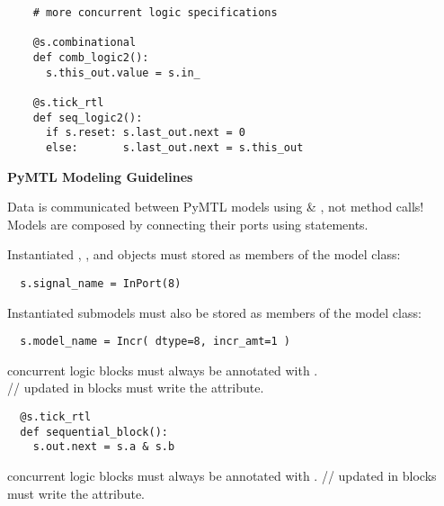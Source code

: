 \documentclass{cbxdoc}
\begin{document}
\begin{landscape}
\begin{minipage}[t]{3.25in}
\begin{lstlisting}
    # more concurrent logic specifications

    @s.combinational
    def comb_logic2():
      s.this_out.value = s.in_

    @s.tick_rtl
    def seq_logic2():
      if s.reset: s.last_out.next = 0
      else:       s.last_out.next = s.this_out
\end{lstlisting}

\end{minipage}%
\hfill%
\begin{minipage}[t]{3.25in}
\vspace{0pt}

\colorbox{gray!30!white}{\parbox{1.025\tw}{\rule[-0.4em]{0pt}{1.4em}\centering\textbf{%
  PyMTL Modeling Guidelines%
}}}

\smallskip\smallskip\raggedright
\begin{cbxlist}{1.5em}{0em}{1em}

  \item Data is communicated between PyMTL models using  \&
     , not method calls! Models are composed
      by connecting their ports using 
     statements.

  \item Instantiated , , and  objects must
         stored as members of the model class:

\begin{verbatim}
  s.signal_name = InPort(8)
\end{verbatim}

  \item Instantiated submodels must also be stored as members of the
     model class:

\begin{verbatim}
  s.model_name = Incr( dtype=8, incr_amt=1 )
\end{verbatim}

  \item {} concurrent logic blocks must always be annotated
     with . \\
     // updated in 
     blocks must write the  attribute.

\begin{verbatim}
  @s.tick_rtl
  def sequential_block():
    s.out.next = s.a & s.b
\end{verbatim}

  \item {} concurrent logic blocks must always be
     annotated with .
     // updated in 
     blocks must write the  attribute.


\end{cbxlist}
\end{minipage}
\end{landscape}
\end{document}
